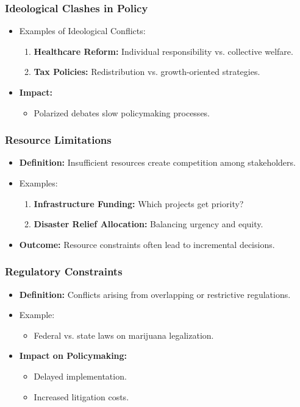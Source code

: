 \documentclass[10pt]{beamer}
\begin{document}
    \begin{frame}
    \frametitle{Ideological Clashes in Policy}
    \begin{itemize}
        \item Examples of Ideological Conflicts:
            \begin{enumerate}
                \item \textbf{Healthcare Reform:} Individual responsibility vs. collective welfare.
                \item \textbf{Tax Policies:} Redistribution vs. growth-oriented strategies.
            \end{enumerate}
        \item \textbf{Impact:}
            \begin{itemize}
                \item Polarized debates slow policymaking processes.
            \end{itemize}
    \end{itemize}
    \end{frame}
    
    \begin{frame}
    \frametitle{Resource Limitations}
    \begin{itemize}
        \item \textbf{Definition:} Insufficient resources create competition among stakeholders.
        \item Examples:
            \begin{enumerate}
                \item \textbf{Infrastructure Funding:} Which projects get priority?
                \item \textbf{Disaster Relief Allocation:} Balancing urgency and equity.
            \end{enumerate}
        \item \textbf{Outcome:} Resource constraints often lead to incremental decisions.
    \end{itemize}
    \end{frame}
    
    \begin{frame}
    \frametitle{Regulatory Constraints}
    \begin{itemize}
        \item \textbf{Definition:} Conflicts arising from overlapping or restrictive regulations.
        \item Example:
            \begin{itemize}
                \item Federal vs. state laws on marijuana legalization.
            \end{itemize}
        \item \textbf{Impact on Policymaking:}
            \begin{itemize}
                \item Delayed implementation.
                \item Increased litigation costs.
            \end{itemize}
    \end{itemize}
    \end{frame}
    
\end{document}
